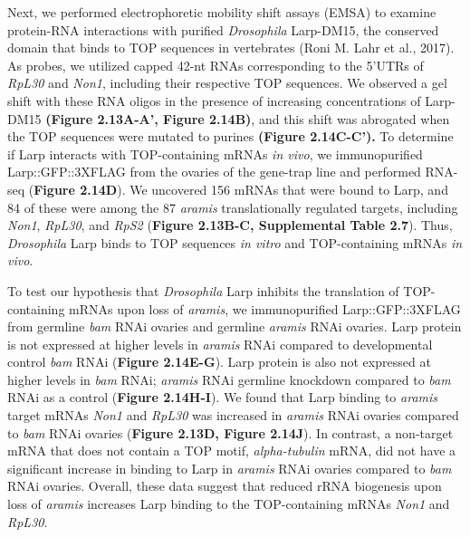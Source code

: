 \documentclass[12pt,oneside]{reedthesis}
\begin{document}
Next, we performed electrophoretic mobility shift assays (EMSA) to
examine protein-RNA interactions with purified \emph{Drosophila} Larp-DM15,
the conserved domain that binds to TOP sequences in vertebrates
(Roni M. Lahr et al., 2017). As probes, we utilized capped 42-nt RNAs corresponding
to the 5'UTRs of \emph{RpL30} and \emph{Non1}, including their respective TOP
sequences. We observed a gel shift with these RNA oligos in the presence
of increasing concentrations of Larp-DM15 \textbf{(Figure 2.13A-A', Figure 2.14B)}, and this shift was abrogated when the TOP sequences were mutated
to purines \textbf{(Figure 2.14C-C').} To determine if Larp interacts with
TOP-containing mRNAs \emph{in vivo}, we immunopurified Larp::GFP::3XFLAG from
the ovaries of the gene-trap line and performed RNA-seq (\textbf{Figure 2.14D}). We uncovered 156 mRNAs that were bound to Larp, and 84 of these
were among the 87 \emph{aramis} translationally regulated targets, including
\emph{Non1}, \emph{RpL30}, and \emph{RpS2} (\textbf{Figure 2.13B-C, Supplemental Table 2.7}).
Thus, \emph{Drosophila} Larp binds to TOP sequences \emph{in vitro} and
TOP-containing mRNAs \emph{in vivo}.

To test our hypothesis that \emph{Drosophila} Larp inhibits the translation
of TOP-containing mRNAs upon loss of \emph{aramis}, we immunopurified
Larp::GFP::3XFLAG from germline \emph{bam} RNAi ovaries and germline \emph{aramis}
RNAi ovaries. Larp protein is not expressed at higher levels in \emph{aramis}
RNAi compared to developmental control \emph{bam} RNAi (\textbf{Figure 2.14E-G}).
Larp protein is also not expressed at higher levels in \emph{bam} RNAi;
\emph{aramis} RNAi germline knockdown compared to \emph{bam} RNAi as a control
(\textbf{Figure 2.14H-I}). We found that Larp binding to \emph{aramis} target mRNAs
\emph{Non1} and \emph{RpL30} was increased in \emph{aramis} RNAi ovaries compared to
\emph{bam} RNAi ovaries (\textbf{Figure 2.13D, Figure 2.14J}). In contrast, a
non-target mRNA that does not contain a TOP motif, \emph{alpha-tubulin} mRNA,
did not have a significant increase in binding to Larp in \emph{aramis} RNAi
ovaries compared to \emph{bam} RNAi ovaries. Overall, these data suggest that
reduced rRNA biogenesis upon loss of \emph{aramis} increases Larp binding to
the TOP-containing mRNAs \emph{Non1} and \emph{RpL30}.
\end{document}
